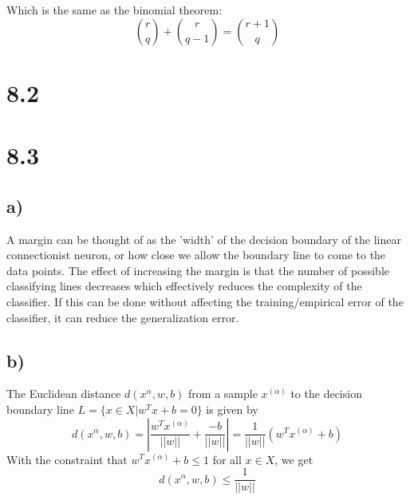 \documentclass[11pt,a4paper]{article}
\begin{document}
Which is the same as the binomial theorem:
\begin{equation}
{r \choose q} + {r \choose q-1} = {r+1 \choose q}
\end{equation}

\section*{8.2}
\section*{8.3}
\subsection*{a)}
A margin can be thought of as the 'width' of the decision boundary of the linear connectionist neuron, or how close we allow the boundary line to come to the data points. The effect of increasing the margin is that the number of possible classifying lines decreases which effectively reduces the complexity of the classifier. If this can be done without affecting the training/empirical error of the classifier, it can reduce the generalization error.
\subsection*{b)}
The Euclidean distance $d(x^\alpha,w,b)$ from a sample $x^{(\alpha)}$ to the decision boundary line $L = \{ x \in X | w^Tx + b = 0\}$ is given by 
\begin{equation}
d(x^\alpha,w,b) = |\frac{w^Tx^{(\alpha)}}{||w||}+\frac{- b}{||w||}| = \frac{1}{||w||}\left ( w^Tx^{(\alpha)} + b \right )
\end{equation}
With the constraint that $w^Tx^{(\alpha)} + b \leq 1$ for all $x \in X$, we get 
\begin{equation}
d(x^\alpha,w,b) \leq \frac{1}{||w||}
\end{equation}
\end{document}
